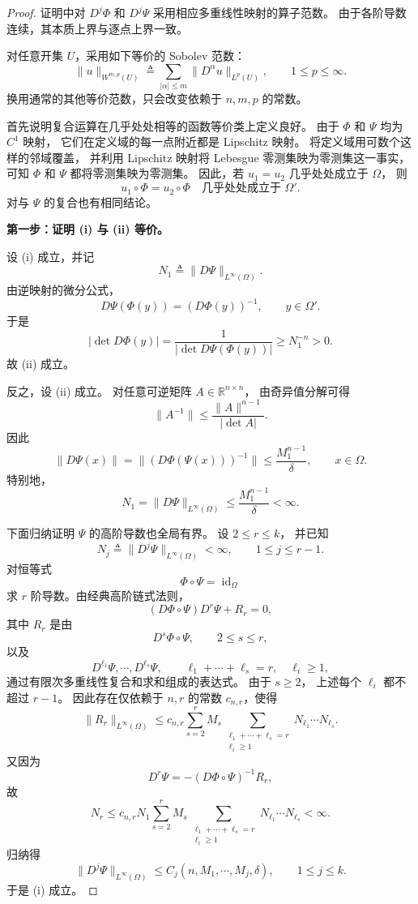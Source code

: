 \documentclass[../../main.tex]{subfiles}%
\begin{document}
\begin{proof}

证明中对 $D^j\Phi$ 和 $D^j\Psi$ 采用相应多重线性映射的算子范数。
由于各阶导数连续，其本质上界与逐点上界一致。

对任意开集 $U$，采用如下等价的 Sobolev 范数：
\[
\|u\|_{W^{m,p}(U)}
\triangleq
\sum_{|\alpha|\leqslant m}
\|D^\alpha u\|_{L^p(U)},
\qquad 1\leqslant p\leqslant\infty.
\]
换用通常的其他等价范数，只会改变依赖于 $n,m,p$ 的常数。

首先说明复合运算在几乎处处相等的函数等价类上定义良好。
由于 $\Phi$ 和 $\Psi$ 均为 $C^1$ 映射，
它们在定义域的每一点附近都是 Lipschitz 映射。
将定义域用可数个这样的邻域覆盖，
并利用 Lipschitz 映射将 Lebesgue 零测集映为零测集这一事实，
可知 $\Phi$ 和 $\Psi$ 都将零测集映为零测集。
因此，若 $u_1=u_2$ 几乎处处成立于 $\Omega$，
则
\[
u_1\circ\Phi=u_2\circ\Phi
\quad\text{几乎处处成立于 }\Omega'.
\]
对与 $\Psi$ 的复合也有相同结论。

\medskip
\noindent
\textbf{第一步：证明 \textup{(i)} 与 \textup{(ii)} 等价。}

设 \textup{(i)} 成立，并记
\[
N_1\triangleq\|D\Psi\|_{L^\infty(\Omega)}.
\]
由逆映射的微分公式，
\[
D\Psi(\Phi(y))=(D\Phi(y))^{-1},
\qquad y\in\Omega'.
\]
于是
\[
|\det D\Phi(y)|
=
\frac{1}{|\det D\Psi(\Phi(y))|}
\geqslant N_1^{-n}>0.
\]
故 \textup{(ii)} 成立。

反之，设 \textup{(ii)} 成立。
对任意可逆矩阵 $A\in\mathbb{R}^{n\times n}$，
由奇异值分解可得
\[
\|A^{-1}\|
\leqslant
\frac{\|A\|^{n-1}}{|\det A|}.
\]
因此
\[
\|D\Psi(x)\|
=
\|(D\Phi(\Psi(x)))^{-1}\|
\leqslant
\frac{M_1^{n-1}}{\delta},
\qquad x\in\Omega.
\]
特别地，
\[
N_1=\|D\Psi\|_{L^\infty(\Omega)}
\leqslant \frac{M_1^{n-1}}{\delta}<\infty.
\]

下面归纳证明 $\Psi$ 的高阶导数也全局有界。
设 $2\leqslant r\leqslant k$，
并已知
\[
N_j\triangleq\|D^j\Psi\|_{L^\infty(\Omega)}<\infty,
\qquad 1\leqslant j\leqslant r-1.
\]
对恒等式
\[
\Phi\circ\Psi=\operatorname{id}_\Omega
\]
求 $r$ 阶导数。由经典高阶链式法则，
\[
(D\Phi\circ\Psi)D^r\Psi+R_r=0,
\]
其中 $R_r$ 是由
\[
D^s\Phi\circ\Psi,
\qquad 2\leqslant s\leqslant r,
\]
以及
\[
D^{\ell_1}\Psi,\cdots,D^{\ell_s}\Psi,
\qquad
\ell_1+\cdots+\ell_s=r,\quad \ell_i\geqslant 1,
\]
通过有限次多重线性复合和求和组成的表达式。
由于 $s\geqslant 2$，
上述每个 $\ell_i$ 都不超过 $r-1$。
因此存在仅依赖于 $n,r$ 的常数 $c_{n,r}$，使得
\[
\|R_r\|_{L^\infty(\Omega)}
\leqslant
c_{n,r}
\sum_{s=2}^{r}M_s
\sum_{\substack{\ell_1+\cdots+\ell_s=r\\ \ell_i\geqslant 1}}
N_{\ell_1}\cdots N_{\ell_s}.
\]
又因为
\[
D^r\Psi
=
-(D\Phi\circ\Psi)^{-1}R_r,
\]
故
\[
N_r
\leqslant
c_{n,r}N_1
\sum_{s=2}^{r}M_s
\sum_{\substack{\ell_1+\cdots+\ell_s=r\\ \ell_i\geqslant 1}}
N_{\ell_1}\cdots N_{\ell_s}
<\infty.
\]
归纳得
\[
\|D^j\Psi\|_{L^\infty(\Omega)}
\leqslant
C_j(n,M_1,\cdots,M_j,\delta),
\qquad 1\leqslant j\leqslant k.
\]
于是 \textup{(i)} 成立。


\end{proof}
\end{document}
